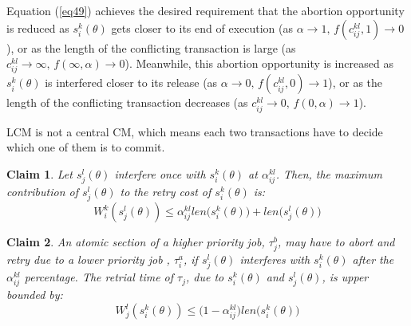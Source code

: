 \documentclass[conference]{sig-alternate}
\newtheorem{clm}{Claim}
\begin{document}
Equation (\ref{eq49}) achieves the desired requirement that the abortion opportunity is reduced as $s_{i}^{k}(\theta)$ gets
closer to its end of execution (as $\alpha\rightarrow1,\, f(c_{ij}^{kl},1)\rightarrow0$),
or as the length of the conflicting transaction is large (as $c_{ij}^{kl}\rightarrow\infty,\, f(\infty,\alpha)\rightarrow0$).
Meanwhile, this abortion opportunity is increased as $s_{i}^{k}(\theta)$
is interfered closer to its release (as $\alpha\rightarrow0,\, f(c_{ij}^{kl},0)\rightarrow1$),
or as the length of the conflicting transaction decreases (as $c_{ij}^{kl}\rightarrow0,\, f(0,\alpha)\rightarrow1$).

LCM is not a central CM, which means each two transactions have to decide which one of them is to commit.

\begin{clm}
\label{LCM_higher_rc}
Let $s_{j}^{l}(\theta)$ interfere once with $s_{i}^{k}(\theta)$ at $\alpha_{ij}^{kl}$. Then, the maximum contribution of $s_{j}^{l}(\theta)$ to the retry cost of $s_{i}^{k}(\theta)$ is:
\begin{equation}
W_i^k(s_j^l(\theta))\le \alpha_{ij}^{kl}len\Big(s_{i}^{k}(\theta)\Big)+len\Big(s_{j}^{l}(\theta)\Big)\label{eq47}\end{equation}
\end{clm}

\begin{clm}
\label{LCM_lower_rc}
An atomic section of a higher priority job, $\tau_{j}^b$, may have to abort and retry due to a lower priority job	, $\tau_{i}^a$, if $s_{j}^{l}(\theta)$ interferes
with $s_{i}^{k}(\theta)$ after the $\alpha_{ij}^{kl}$ percentage.
The retrial time of $\tau_{j}$, due to $s_{i}^{k}(\theta)$ and $s_{j}^{l}(\theta)$,
is upper bounded by:
 \begin{equation}
W_j^l(s_i^k(\theta))\le \Big(1-\alpha_{ij}^{kl}\Big)len\Big(s_{i}^{k}(\theta)\Big)\label{eq48}\end{equation}
\end{clm}

\end{document}
